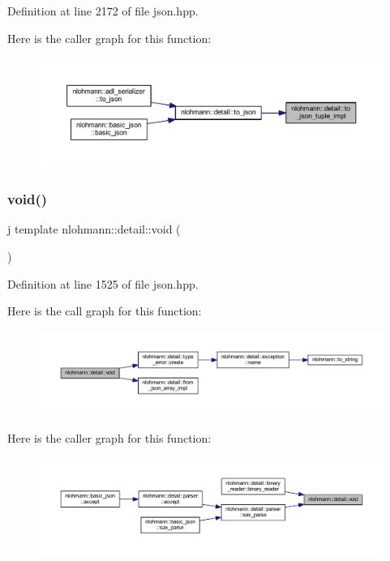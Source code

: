 Definition at line 2172 of file json.\+hpp.

Here is the caller graph for this function\+:
\nopagebreak
\begin{figure}[H]
\begin{center}
\leavevmode
\includegraphics[width=350pt]{namespacenlohmann_1_1detail_a510dfa15b01e9a8afe31600a27b28199_icgraph}
\end{center}
\end{figure}
\mbox{\label{namespacenlohmann_1_1detail_a59fca69799f6b9e366710cb9043aa77d}} 
\subsubsection{\texorpdfstring{void()}{void()}}
{\footnotesize\ttfamily j template nlohmann\+::detail\+::void (\begin{DoxyParamCaption}{ }\end{DoxyParamCaption})}



Definition at line 1525 of file json.\+hpp.

Here is the call graph for this function\+:
\nopagebreak
\begin{figure}[H]
\begin{center}
\leavevmode
\includegraphics[width=350pt]{namespacenlohmann_1_1detail_a59fca69799f6b9e366710cb9043aa77d_cgraph}
\end{center}
\end{figure}
Here is the caller graph for this function\+:
\nopagebreak
\begin{figure}[H]
\begin{center}
\leavevmode
\includegraphics[width=350pt]{namespacenlohmann_1_1detail_a59fca69799f6b9e366710cb9043aa77d_icgraph}
\end{center}
\end{figure}
